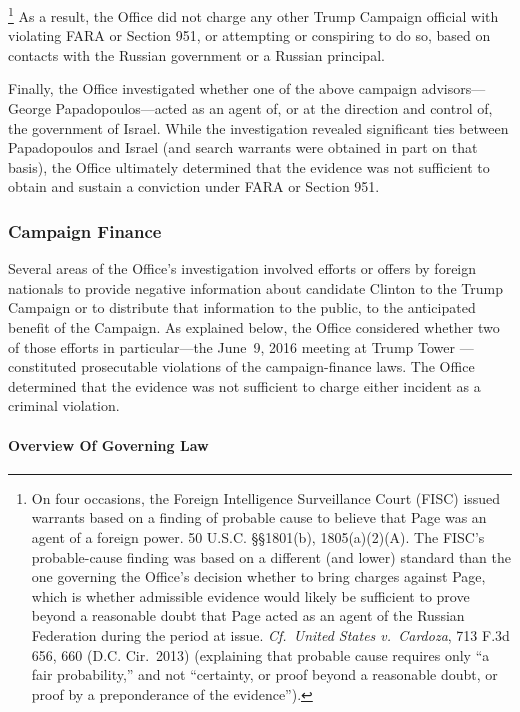 \footnote{On four occasions, the Foreign Intelligence Surveillance Court (FISC) issued warrants based on a finding of probable cause to believe that Page was an agent of a foreign power.
50 U.S.C. \S\S 1801(b), 1805(a)(2)(A).
The FISC's probable-cause finding was based on a different (and lower) standard than the one governing the Office's decision whether to bring charges against Page, which is whether admissible evidence would likely be sufficient to prove beyond a reasonable doubt that Page acted as an agent of the Russian Federation during the period at issue.
\textit{Cf.~United States v.\ Cardoza}, 713 F.3d 656, 660 (D.C. Cir.~2013) (explaining that probable cause requires only “a fair probability,” and not “certainty, or proof beyond a reasonable doubt, or proof by a preponderance of the evidence”).}
As a result, the Office did not charge  any other Trump Campaign official with violating FARA or Section 951, or attempting or conspiring to do so, based on contacts with the Russian government or a Russian principal.

Finally, the Office investigated whether one of the above campaign advisors---George Papadopoulos---acted as an agent of, or at the direction and control of, the government of Israel.
While the investigation revealed significant ties between Papadopoulos and Israel (and search warrants were obtained in part on that basis), the Office ultimately determined that the evidence was not sufficient to obtain and sustain a conviction under FARA or Section 951.

\subsubsection{Campaign Finance}
Several areas of the Office's investigation involved efforts or offers by foreign nationals to provide negative information about candidate Clinton to the Trump Campaign or to distribute that information to the public, to the anticipated benefit of the Campaign.
As explained below, the Office considered whether two of those efforts in particular---the June~9, 2016 meeting at Trump Tower ---constituted prosecutable violations of the campaign-finance laws.
The Office determined that the evidence was not sufficient to charge either incident as a criminal violation.

\paragraph{Overview Of Governing Law}

